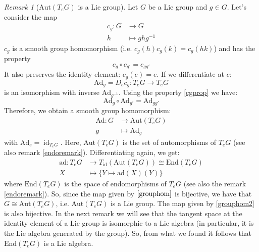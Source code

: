 \documentclass[a4paper,11pt,titlepage, article, oneside]{memoir}
\numberwithin{equation}{section}
\theoremstyle{definition}
\theoremstyle{remark}
\newtheorem{remark}[theorem]{Remark}
\DeclareMathOperator{\id}{id}
\begin{document}
\begin{remarkbox}\begin{remark} [$\text{Aut}(T_e G)$ is a Lie group] \label{autremark}
Let $G$ be a  Lie group and $g \in G$. Let's consider the map 
\begin{align} \label{cgmap}
c_g \colon G &\rightarrow G \\
h &\mapsto g h g^{-1} \nonumber
\end{align}
$c_g$ is  a smooth group homomorphism (i.e. $c_g(h)c_g(k)=c_g(hk)$) and has the property 
\begin{equation} \label{cgprop}
c_g \circ c_{g'} = c_{g g'}
\end{equation}
 It also preserves the identity element: $c_g(e) = e$. If we differentiate at $e$:
\begin{equation}
\text{Ad}_g = D_e c_g \colon T_e G \rightarrow T_e G
\end{equation}
is an isomorphism with inverse $\text{Ad}_{g^{-1}}$. Using the property \eqref{cgprop} we have:
\begin{equation}
\text{Ad}_g \circ \text{Ad}_{g'} = \text{Ad}_{gg'}
\end{equation}
Therefore, we obtain a smooth group homomorphism:
\begin{align} \label{grouphom}
\text{Ad} \colon G &\rightarrow \text{Aut}(T_e G)  \\
g &\mapsto \text{Ad}_g \nonumber
\end{align}
with $\text{Ad}_e = \id_{T_e G}$. Here, $\text{Aut}(T_e G)$ is the set of automorphisms of $T_e G$ (see also remark \ref{endoremark}).
Differentiating again, we get:
\begin{align} \label{grouphom2}
\text{ad} \colon T_e G &\rightarrow T_{\id} (\text{Aut}(T_e G)) \cong \text{End}(T_e G) \\
X &\mapsto \{ Y \mapsto \text{ad}(X)(Y)\} \nonumber
\end{align}
where $\text{End}(T_e G)$ is the space of endomorphisms of $T_e G$ (see also the remark \eqref{endoremark}).
So, since the map given by $\ref{grouphom}$ is bijective, we have that $G \cong \text{Aut}(T_e G)$, i.e. $\text{Aut}(T_e G)$ is a Lie group.  The map given by \eqref{grouphom2} is also bijective. In the next remark we will see that the tangent space at the identity element of a Lie group is isomorphic to a Lie algebra (in particular, it is the Lie algebra generated by the group). So, from what we found it follows that $\text{End}(T_e G)$ is a Lie algebra.
\end{remark}\end{remarkbox}
\end{document}
